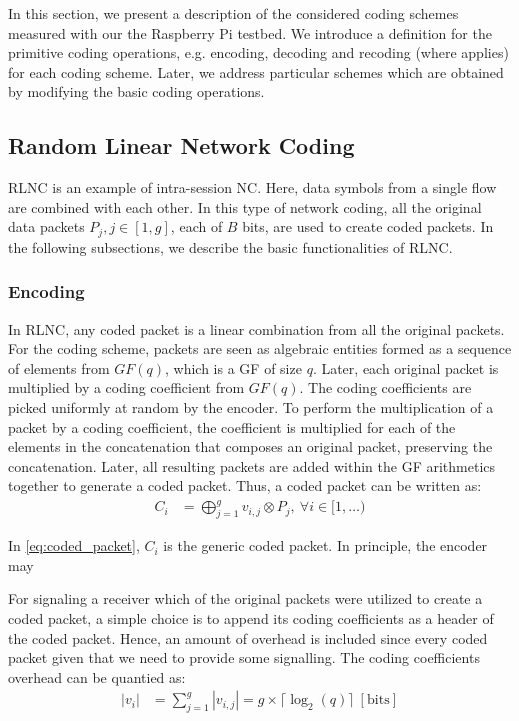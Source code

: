 \label{sec:schemes}

In this section, we present a description of the considered coding schemes
measured with our the Raspberry Pi testbed. We introduce a definition
for the primitive coding operations, e.g. encoding, decoding and recoding
(where applies) for each coding scheme. Later, we address particular schemes
which are obtained by modifying the basic coding operations.

\subsection{Random Linear Network Coding}

\ac{RLNC} is an example of intra-session \ac{NC}. Here, data symbols from a
single flow are combined with each other. In this type of network coding,
all the original data packets $P_j, j \in [1,g]$, each of $B$ bits, are used
to create coded packets. In the following subsections, we describe the
basic functionalities of \ac{RLNC}.

\subsubsection{Encoding}
In \ac{RLNC}, any coded packet is a linear combination from all
the original packets. For the coding scheme, packets are seen as
algebraic entities formed as a sequence of elements from $GF(q)$,
which is a \ac{GF} of size $q$. Later, each original packet is
multiplied by a coding coefficient from $GF(q)$. The coding coefficients
are picked uniformly at random by the encoder. To perform the
multiplication of a packet by a coding coefficient, the coefficient is
multiplied for each of the elements in the concatenation that composes
an original packet, preserving the concatenation. Later, all resulting
packets are added within the \ac{GF} arithmetics together to generate
a coded packet. Thus, a coded packet can be written as:
%
\begin{align} \label{eq:coded_packet}
C_i  &= \bigoplus_{j=1}^{g} v_{i,j} \otimes P_j ,\ \forall i \in [1,\ldots)
\end{align}

In \eqref{eq:coded_packet}, $C_i$ is the generic coded packet. In principle,
the encoder may

For signaling a receiver which of the original packets were utilized to
create a coded packet, a simple choice is to append its coding coefficients
as a header of the coded packet. Hence, an amount of overhead is included
since every coded packet given that we need to provide some signalling.
The coding coefficients overhead can be quantied as:
%
\begin{align} \label{eq:coded_packet_coef}
|v_i| &= \sum_{j=1}^{g} |v_{i,j}| = g \times \lceil \log_{2} (q)
\rceil ~ [\mathrm{bits}]
\end{align}

